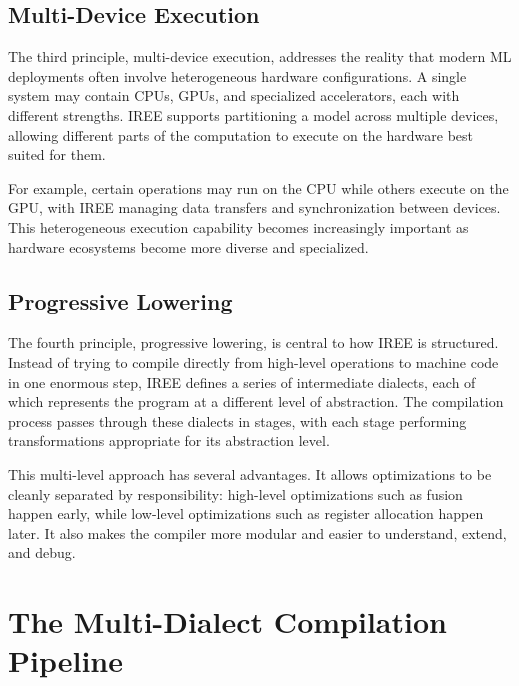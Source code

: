 \documentclass[11pt,a4paper]{article}
\begin{document}
\subsection{Multi-Device Execution}

The third principle, multi-device execution, addresses the reality that modern ML deployments often involve heterogeneous hardware configurations. A single system may contain CPUs, GPUs, and specialized accelerators, each with different strengths. IREE supports partitioning a model across multiple devices, allowing different parts of the computation to execute on the hardware best suited for them.

For example, certain operations may run on the CPU while others execute on the GPU, with IREE managing data transfers and synchronization between devices. This heterogeneous execution capability becomes increasingly important as hardware ecosystems become more diverse and specialized.

\subsection{Progressive Lowering}

The fourth principle, progressive lowering, is central to how IREE is structured. Instead of trying to compile directly from high-level operations to machine code in one enormous step, IREE defines a series of intermediate dialects, each of which represents the program at a different level of abstraction. The compilation process passes through these dialects in stages, with each stage performing transformations appropriate for its abstraction level.

This multi-level approach has several advantages. It allows optimizations to be cleanly separated by responsibility: high-level optimizations such as fusion happen early, while low-level optimizations such as register allocation happen later. It also makes the compiler more modular and easier to understand, extend, and debug.

\section{The Multi-Dialect Compilation Pipeline}
\end{document}
